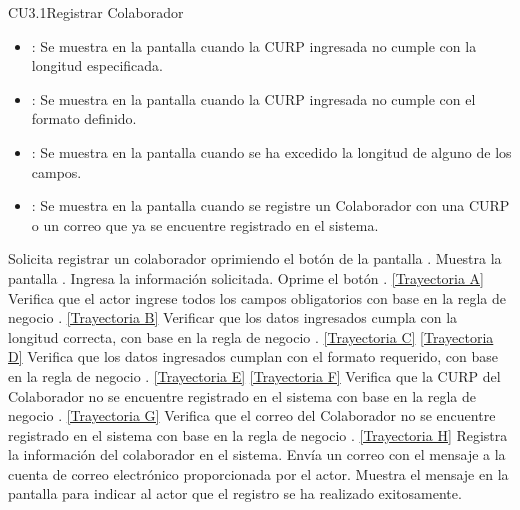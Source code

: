 \begin{UseCase}{CU3.1}{Registrar Colaborador}
{\begin{itemize}
		\item {}: Se muestra en la pantalla  cuando la CURP ingresada no cumple con la longitud especificada.
		\item {}: Se muestra en la pantalla  cuando la CURP ingresada no cumple con el formato definido.
		\item {}: Se muestra en la pantalla  cuando se ha excedido la longitud de alguno de los campos.
		\item {}: Se muestra en la pantalla  cuando se registre un Colaborador con una CURP o un correo que ya se encuentre registrado en el sistema.
		\end{itemize}
		}
	\end{UseCase}
	\begin{UCtrayectoria}
		\UCpaso[\UCactor] Solicita registrar un colaborador oprimiendo el botón  de la pantalla .
		\UCpaso[\UCsist] Muestra la pantalla .
		\UCpaso[\UCactor] Ingresa la información solicitada. \label{CU3.1-P3}
		\UCpaso[\UCactor] Oprime el botón . \hyperlink{CU3-1:TAA}{[Trayectoria A]}
		\UCpaso[\UCsist] Verifica que el actor ingrese todos los campos obligatorios con base en la regla de negocio . \hyperlink{CU3-1:TAB}{[Trayectoria B]}
		\UCpaso[\UCsist] Verificar que los datos ingresados cumpla con la longitud correcta, con base en la regla de negocio . \hyperlink{CU3-1:TAC}{[Trayectoria C]} \hyperlink{CU3-1:TAD}{[Trayectoria D]}
		\UCpaso[\UCsist] Verifica que los datos ingresados cumplan con el formato requerido, con base en la regla de negocio . \hyperlink{CU3-1:TAE}{[Trayectoria E]} \hyperlink{CU3-1:TAF}{[Trayectoria F]}
		\UCpaso[\UCsist] Verifica que la CURP del Colaborador no se encuentre registrado en el sistema con base en la regla de negocio . \hyperlink{CU3-1:TAG}{[Trayectoria G]}
		\UCpaso[\UCsist] Verifica que el correo del Colaborador no se encuentre registrado en el sistema con base en la regla de negocio . \hyperlink{CU3-1:TAH}{[Trayectoria H]}
		\UCpaso[\UCsist] Registra la información del colaborador en el sistema.
		\UCpaso[\UCsist] Envía un correo con el mensaje  a la cuenta de correo electrónico proporcionada por el actor.
		\UCpaso[\UCsist] Muestra el mensaje  en la pantalla  para indicar al actor que el registro se ha realizado exitosamente.
	\end{UCtrayectoria}		
